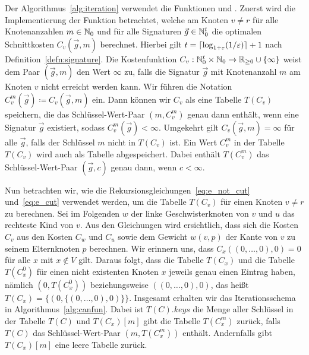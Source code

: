 Der Algorithmus~\ref{alg:iteration} verwendet die Funktionen \canfun{} und \carfun{}.
Zuerst wird die Implementierung der Funktion \canfun{} betrachtet, welche am Knoten $v \neq r$ für alle Knotenanzahlen $m \in \mathbb{N}_0$ und für alle Signaturen $\vec{g} \in \mathbb{N}_0^t$ die optimalen Schnittkosten $C_v(\vec{g}, m)$ berechnet.
Hierbei gilt $t = \lceil\log_{1+\varepsilon}(1/\varepsilon)\rceil + 1$ nach Definition~\ref{defn:signature}.
Die Kostenfunktion $C_v : \mathbb{N}_0^t \times \mathbb{N}_0 \rightarrow \mathbb{R}_{\geq 0} \cup \{\infty\}$ weist dem Paar $(\vec{g}, m)$ den Wert $\infty$ zu, falls die Signatur $\vec{g}$ mit Knotenanzahl $m$ am Knoten $v$ nicht erreicht werden kann.
Wir führen die Notation $C^m_v(\vec{g}) \coloneqq C_v(\vec{g}, m)$ ein.
Dann können wir $C_v$ als eine Tabelle $T(C_v)$ speichern, die das Schlüssel-Wert-Paar $(m,C^m_v)$ genau dann enthält, wenn eine Signatur $\vec{g}$ existiert, sodass $C^m_v(\vec{g}) < \infty$.
Umgekehrt gilt $C_v(\vec{g}, m) = \infty$ für alle $\vec{g}$, falls der Schlüssel $m$ nicht in $T(C_v)$ ist.
Ein Wert $C_v^m$ in der Tabelle $T(C_v)$ wird auch als Tabelle abgespeichert.
Dabei enthält $T(C_v^m)$ das Schlüssel-Wert-Paar $(\vec{g}, c)$ genau dann, wenn $c < \infty$.

Nun betrachten wir, wie die Rekursionsgleichungen~\eqref{eq:e_not_cut} und~\eqref{eq:e_cut} verwendet werden, um die Tabelle $T(C_v)$ für einen Knoten $v \neq r$ zu berechnen.
Sei im Folgenden $w$ der linke Geschwisterknoten von $v$ und $u$ das rechteste Kind von $v$.
Aus den Gleichungen wird ersichtlich, dass sich die Kosten $C_v$ aus den Kosten $C_w$ und $C_u$ sowie dem Gewicht $w(v, p)$ der Kante von $v$ zu seinem Elternknoten $p$ berechnen.
Wir erinnern uns, dass $C_x((0,\ldots, 0),0) = 0$ für alle $x$ mit $x \notin V$ gilt. 
Daraus folgt, dass die Tabelle $T(C_x)$ und die Tabelle $T(C^0_x)$ für einen nicht existenten Knoten $x$ jeweils genau einen Eintrag haben, nämlich $(0, T(C^0_x))$ beziehungsweise $((0,\ldots,0), 0)$, das heißt $T(C_x) = \{(0, \{(0, \ldots, 0), 0)\}\}$.
Insgesamt erhalten wir das Iterationsschema in Algorithmus~\ref{alg:canfun}.
Dabei ist $T(C).keys$ die Menge aller Schlüssel in der Tabelle $T(C)$ und $T(C_x)[m]$ gibt die Tabelle $T(C^m_x)$ zurück, falls $T(C)$ das Schlüssel-Wert-Paar $(m, T(C^m_x))$ enthält.
Andernfalls gibt $T(C_x)[m]$ eine leere Tabelle zurück.

